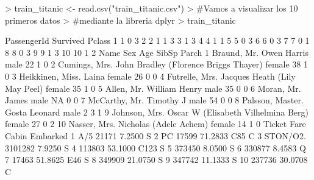 \documentclass [a4paper] {article}
\begin{document}
\begin{Schunk}
\begin{Sinput}
> train_titanic <- read.csv("train_titanic.csv")
> #Vamos a visualizar los 10 primeros datos
> #mediante la libreria dplyr
> train_titanic %>% head(10)
\end{Sinput}
\begin{Soutput}
   PassengerId Survived Pclass
1            1        0      3
2            2        1      1
3            3        1      3
4            4        1      1
5            5        0      3
6            6        0      3
7            7        0      1
8            8        0      3
9            9        1      3
10          10        1      2
                                                  Name    Sex Age SibSp Parch
1                              Braund, Mr. Owen Harris   male  22     1     0
2  Cumings, Mrs. John Bradley (Florence Briggs Thayer) female  38     1     0
3                               Heikkinen, Miss. Laina female  26     0     0
4         Futrelle, Mrs. Jacques Heath (Lily May Peel) female  35     1     0
5                             Allen, Mr. William Henry   male  35     0     0
6                                     Moran, Mr. James   male  NA     0     0
7                              McCarthy, Mr. Timothy J   male  54     0     0
8                       Palsson, Master. Gosta Leonard   male   2     3     1
9    Johnson, Mrs. Oscar W (Elisabeth Vilhelmina Berg) female  27     0     2
10                 Nasser, Mrs. Nicholas (Adele Achem) female  14     1     0
             Ticket    Fare Cabin Embarked
1         A/5 21171  7.2500              S
2          PC 17599 71.2833   C85        C
3  STON/O2. 3101282  7.9250              S
4            113803 53.1000  C123        S
5            373450  8.0500              S
6            330877  8.4583              Q
7             17463 51.8625   E46        S
8            349909 21.0750              S
9            347742 11.1333              S
10           237736 30.0708              C
\end{Soutput}
\end{Schunk}
\end{document}
